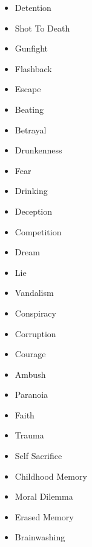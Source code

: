 \begin{minipage}[t]{.5\textwidth}
       \begin{itemize}
        \item Detention
        \item Shot To Death
        \item Gunfight
        \item Flashback
        \item Escape
        \item Beating
        \item Betrayal
        \item Drunkenness
        \item Fear
        \item Drinking
        \item Deception
        \item Competition
        \item Dream
        \item Lie 
        \item Vandalism
        \item Conspiracy
        \item Corruption
        \item Courage
        \item Ambush
        \item Paranoia
        \item Faith
        \item Trauma
        \item Self Sacrifice
        \item Childhood Memory
        \item Moral Dilemma
        \item Erased Memory
        \item Brainwashing
    \end{itemize}
\end{minipage}
